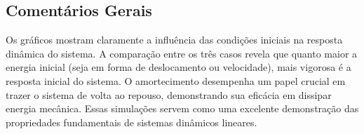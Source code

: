 \subsection{Comentários Gerais}
Os gráficos mostram claramente a influência das condições iniciais na resposta dinâmica do sistema. A comparação entre os três casos revela que quanto maior a energia inicial (seja em forma de deslocamento ou velocidade), mais vigorosa é a resposta inicial do sistema. O amortecimento desempenha um papel crucial em trazer o sistema de volta ao repouso, demonstrando sua eficácia em dissipar energia mecânica. Essas simulações servem como uma excelente demonstração das propriedades fundamentais de sistemas dinâmicos lineares.
